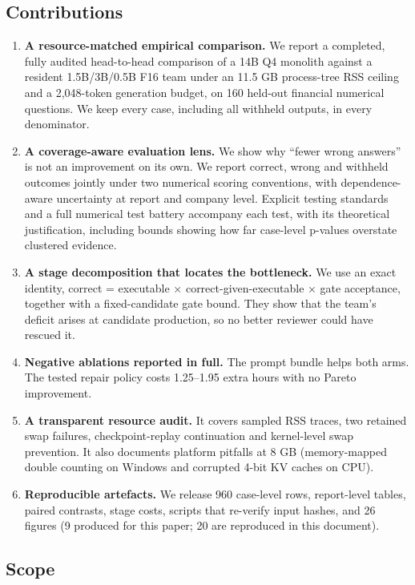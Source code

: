 \documentclass[letterpaper]{article}
\providecommand{\tightlist}{}
\begin{document}
\subsection{Contributions}\label{contributions}

\begin{enumerate}
\def\labelenumi{\arabic{enumi}.}
\tightlist
\item
  \textbf{A resource-matched empirical comparison.} We report a completed, fully audited head-to-head comparison of a 14B Q4 monolith against a resident 1.5B/3B/0.5B F16 team under an 11.5 GB process-tree RSS ceiling and a 2,048-token generation budget, on 160 held-out financial numerical questions. We keep every case, including all withheld outputs, in every denominator.
\item
  \textbf{A coverage-aware evaluation lens.} We show why ``fewer wrong answers'' is not an improvement on its own. We report correct, wrong and withheld outcomes jointly under two numerical scoring conventions, with dependence-aware uncertainty at report and company level. Explicit testing standards and a full numerical test battery accompany each test, with its theoretical justification, including bounds showing how far case-level p-values overstate clustered evidence.
\item
  \textbf{A stage decomposition that locates the bottleneck.} We use an exact identity, correct = executable × correct-given-executable × gate acceptance, together with a fixed-candidate gate bound. They show that the team's deficit arises at candidate production, so no better reviewer could have rescued it.
\item
  \textbf{Negative ablations reported in full.} The prompt bundle helps both arms. The tested repair policy costs 1.25--1.95 extra hours with no Pareto improvement.
\item
  \textbf{A transparent resource audit.} It covers sampled RSS traces, two retained swap failures, checkpoint-replay continuation and kernel-level swap prevention. It also documents platform pitfalls at 8 GB (memory-mapped double counting on Windows and corrupted 4-bit KV caches on CPU).
\item
  \textbf{Reproducible artefacts.} We release 960 case-level rows, report-level tables, paired contrasts, stage costs, scripts that re-verify input hashes, and 26 figures (9 produced for this paper; 20 are reproduced in this document).
\end{enumerate}

\subsection{Scope}\label{scope}
\end{document}
